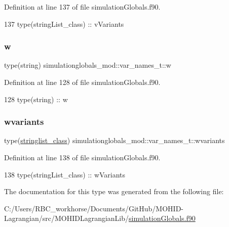 Definition at line 137 of file simulation\+Globals.\+f90.


\begin{DoxyCode}
137         \textcolor{keywordtype}{type}(stringList\_class) :: vVariants
\end{DoxyCode}
\mbox{\label{structsimulationglobals__mod_1_1var__names__t_ae4070fb0bad811c92b85bb008b3a269d}} 
\subsubsection{\texorpdfstring{w}{w}}
{\footnotesize\ttfamily type(string) simulationglobals\+\_\+mod\+::var\+\_\+names\+\_\+t\+::w\hspace{0.3cm}{\ttfamily [private]}}



Definition at line 128 of file simulation\+Globals.\+f90.


\begin{DoxyCode}
128         \textcolor{keywordtype}{type}(string) :: w
\end{DoxyCode}
\mbox{\label{structsimulationglobals__mod_1_1var__names__t_af3bc922623f55af5770d652861ec83a7}} 
\subsubsection{\texorpdfstring{wvariants}{wvariants}}
{\footnotesize\ttfamily type(\mbox{\hyperlink{structsimulationglobals__mod_1_1stringlist__class}{stringlist\+\_\+class}}) simulationglobals\+\_\+mod\+::var\+\_\+names\+\_\+t\+::wvariants\hspace{0.3cm}{\ttfamily [private]}}



Definition at line 138 of file simulation\+Globals.\+f90.


\begin{DoxyCode}
138         \textcolor{keywordtype}{type}(stringList\_class) :: wVariants
\end{DoxyCode}


The documentation for this type was generated from the following file\+:\begin{DoxyCompactItemize}
\item 
C\+:/\+Users/\+R\+B\+C\+\_\+workhorse/\+Documents/\+Git\+Hub/\+M\+O\+H\+I\+D-\/\+Lagrangian/src/\+M\+O\+H\+I\+D\+Lagrangian\+Lib/\mbox{\hyperlink{simulation_globals_8f90}{simulation\+Globals.\+f90}}\end{DoxyCompactItemize}
